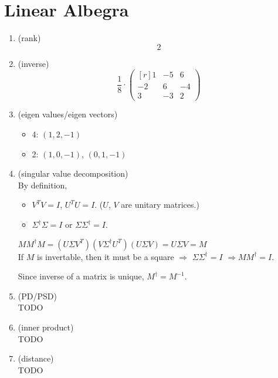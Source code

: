 \section{Linear Albegra}
\begin{enumerate}[(1)]
	\item (rank) \\
		\[ 2 \]
	\item (inverse) \\
		\[
			\frac{1}{8} \cdot
			\begin{pmatrix*}[r]
				1 & -5 & 6 \\
				-2 & 6 & -4 \\
				3 & -3 & 2
			\end{pmatrix*}
		\]
	\item (eigen values/eigen vectors) \\
		\begin{itemize}
			\item 4: $(1, 2, -1)$
			\item 2: $(1, 0, -1)$, $(0, 1, -1)$
		\end{itemize}
	\item (singular value decomposition) \\
		By definition,
		\begin{itemize}
			\item $V^T V=I$, $U^T U=I$. ($U$, $V$ are unitary matrices.)
			\item $\Sigma^{\dagger}\Sigma=I$ or $\Sigma\Sigma^{\dagger}=I$.
		\end{itemize}
		$MM^{\dagger}M = (U\Sigma V^T)(V\Sigma^{\dagger}U^T)(U\Sigma V) = U\Sigma V = M$ \\
		If $M$ is invertable, then it must be a square $\Rightarrow$ $\Sigma\Sigma^{\dagger}=I$ $\Rightarrow MM^{\dagger}=I$.

		Since inverse of a matrix is unique, $M^{\dagger}=M^{-1}$.
	\item (PD/PSD) \\
		TODO
	\item (inner product) \\
		TODO
	\item (distance) \\
		TODO
\end{enumerate}
